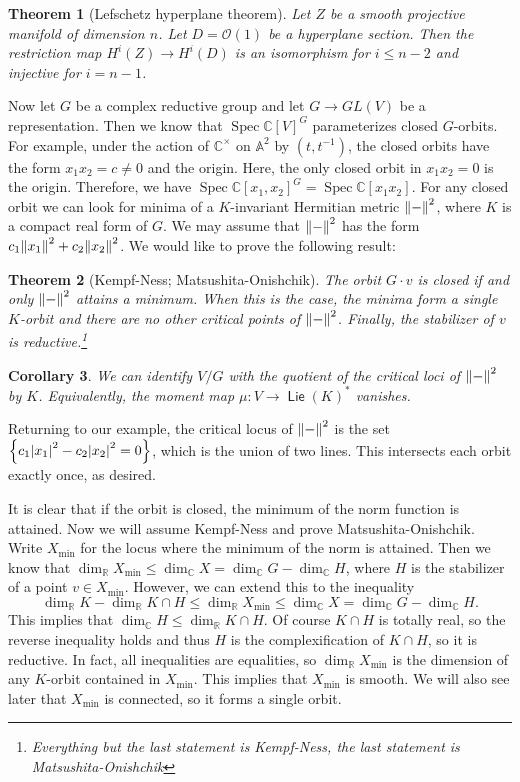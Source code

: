 \documentclass[leqno, openany]{memoir}
\newtheorem{thm}{Theorem}[section]
\newtheorem{cor}[thm]{Corollary}
\theoremstyle{definition}
\theoremstyle{remark}
\theoremstyle{plain}
\theoremstyle{definition}
\theoremstyle{remark}
\newcommand{\A}{\mathbb{A}}
\newcommand{\R}{\mathbb{R}}
\newcommand{\C}{\mathbb{C}}
\newcommand{\mc}[1]{\mathcal{#1}}
\DeclareMathOperator{\Spec}{Spec}
\DeclareMathOperator{\Lie}{\mathsf{Lie}}
\begin{document}
\begin{thm}[Lefschetz hyperplane theorem]
    Let $Z$ be a smooth projective manifold of dimension $n$. Let $D = \mc{O}(1)$ be a hyperplane section. Then the restriction map $H^i(Z) \to H^i(D)$ is an isomorphism for $i \leq n-2$ and injective for $i = n-1$.
\end{thm}

Now let $G$ be a complex reductive group and let $G \to GL(V)$ be a representation. Then we know that $\Spec {\C[V]}^G$ parameterizes closed $G$-orbits. For example, under the action of $\C^{\times}$ on $\A^2$ by $(t, t^{-1})$, the closed orbits have the form $x_1x_2 = c \neq 0$ and the origin. Here, the only closed orbit in $x_1x_2 = 0$ is the origin. Therefore, we have $\Spec {\C[x_1,x_2]}^G = \Spec \C[x_1x_2]$. For any closed orbit we can look for minima of a $K$-invariant Hermitian metric $\norm{-}^2$, where $K$ is a compact real form of $G$. We may assume that $\norm{-}^2$ has the form $c_1 \norm{x_1}^2 + c_2 \norm{x_2}^2$. We would like to prove the following result:

\begin{thm}[Kempf-Ness; Matsushita-Onishchik]
    The orbit $G\cdot v$ is closed if and only $\norm{-}^2$ attains a minimum. When this is the case, the minima form a single $K$-orbit and there are no other critical points of $\norm{-}^2$. Finally, the stabilizer of $v$ is reductive.\footnote{Everything but the last statement is Kempf-Ness, the last statement is Matsushita-Onishchik}
\end{thm}

\begin{cor}
    We can identify $V/G$ with the quotient of the critical loci of $\norm{-}^2$ by $K$. Equivalently, the moment map $\mu \colon V \to {\Lie(K)}^*$ vanishes.
\end{cor}

Returning to our example, the critical locus of $\norm{-}^2$ is the set $\qty{c_1 \abs{x_1}^2 - c_2 \abs{x_2}^2 = 0}$, which is the union of two lines. This intersects each orbit exactly once, as desired.

It is clear that if the orbit is closed, the minimum of the norm function is attained. Now we will assume Kempf-Ness and prove Matsushita-Onishchik. Write $X_{\min}$ for the locus where the minimum of the norm is attained. Then we know that $\dim_{\R} X_{\min} \leq \dim_{\C} X = \dim_{\C} G - \dim_{\C} H$, where $H$ is the stabilizer of a point $v \in X_{\min}$. However, we can extend this to the inequality
\[ \dim_{\R} K - \dim_{\R} K \cap H \leq \dim_{\R} X_{\min} \leq \dim_{\C} X = \dim_{\C} G - \dim_{\C} H. \]
This implies that $\dim_{\C} H \leq \dim_{\R} K \cap H$. Of course $K \cap H$ is totally real, so the reverse inequality holds and thus $H$ is the complexification of $K \cap H$, so it is reductive. In fact, all inequalities are equalities, so $\dim_{\R} X_{\min}$ is the dimension of any $K$-orbit contained in $X_{\min}$. This implies that $X_{\min}$ is smooth. We will also see later that $X_{\min}$ is connected, so it forms a single orbit.
\end{document}
